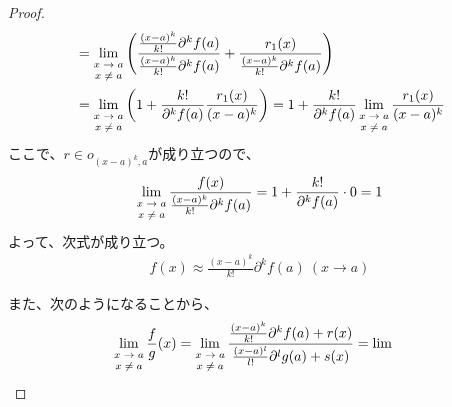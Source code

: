 \documentclass[dvipdfmx]{jsarticle}
\begin{document}
\begin{proof}
\begin{align*}
&= \lim_{\scriptsize \begin{matrix}
x \rightarrow a \\
x \neq a \\
\end{matrix}}\left( \frac{\frac{(x - a)^{k}}{k!}\partial^{k}f(a)}{\frac{(x - a)^{k}}{k!}\partial^{k}f(a)} + \frac{r_{1}(x)}{\frac{(x - a)^{k}}{k!}\partial^{k}f(a)} \right)\\
&= \lim_{\scriptsize \begin{matrix}
x \rightarrow a \\
x \neq a \\
\end{matrix}}\left( 1 + \frac{k!}{\partial^{k}f(a)}\frac{r_{1}(x)}{(x - a)^{k}} \right) = 1 + \frac{k!}{\partial^{k}f(a)}\lim_{\scriptsize \begin{matrix}
x \rightarrow a \\
x \neq a \\
\end{matrix}}\frac{r_{1}(x)}{(x - a)^{k}}
\end{align*}
ここで、$r \in o_{(x - a)^{k},a}$が成り立つので、
\begin{align*}
\lim_{\scriptsize \begin{matrix}
x \rightarrow a \\
x \neq a \\
\end{matrix}}\frac{f(x)}{\frac{(x - a)^{k}}{k!}\partial^{k}f(a)} = 1 + \frac{k!}{\partial^{k}f(a)} \cdot 0 = 1
\end{align*}
よって、次式が成り立つ。
\begin{align*}
f(x) \approx \frac{(x - a)^{k}}{k!}\partial^{k}f(a)\ (x \rightarrow a)
\end{align*}\par
また、次のようになることから、
\begin{align*}
\lim_{\scriptsize \begin{matrix}
x \rightarrow a \\
x \neq a \\
\end{matrix}}{\frac{f}{g}(x)} &= \lim_{\scriptsize \begin{matrix}
x \rightarrow a \\
x \neq a \\
\end{matrix}}\frac{\frac{(x - a)^{k}}{k!}\partial^{k}f(a) + r(x)}{\frac{(x - a)^{l}}{l!}\partial^{l}g(a) + s(x)} = \lim_{\scriptsize \begin{matrix}

\end{matrix}}
\end{align*}
\end{proof}
\end{document}

